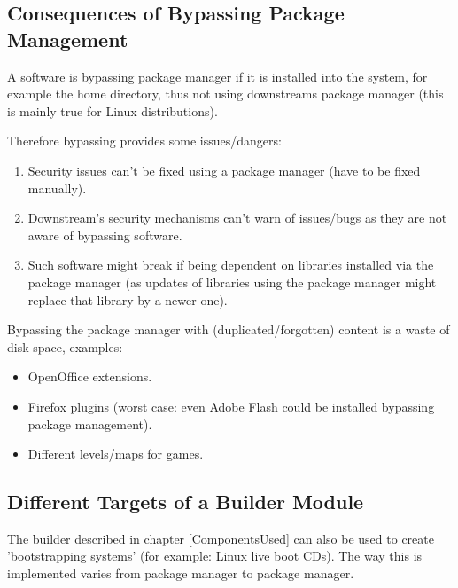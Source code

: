 \documentclass[a4paper,10pt]{article}
\begin{document}
\subsection{Consequences of Bypassing Package Management}
A software is bypassing package manager if it is installed into the system, for example the home directory, thus not using downstreams package manager (this is mainly true for Linux distributions). 

Therefore bypassing provides some issues/dangers:
\begin{enumerate}
\item Security issues can't be fixed using a package manager (have to be fixed manually).
\item Downstream's security mechanisms can't warn of issues/bugs as they are not aware of bypassing software.
\item Such software might break if being dependent on libraries installed via the package manager (as updates of libraries using the package manager might replace that library by a newer one).
\end{enumerate}
Bypassing the package manager with (duplicated/forgotten) content is a waste of disk space, examples:
\begin{itemize}
\item OpenOffice extensions.
\item Firefox plugins (worst case: even Adobe Flash could be installed bypassing package management).
\item Different levels/maps for games.
\end{itemize}










\subsection{Different Targets of a Builder Module}
The builder described in chapter \ref{ComponentsUsed} can also be used to create 'bootstrapping systems' (for example: Linux live boot CDs). The way this is implemented varies from package manager to package manager.
\end{document}
